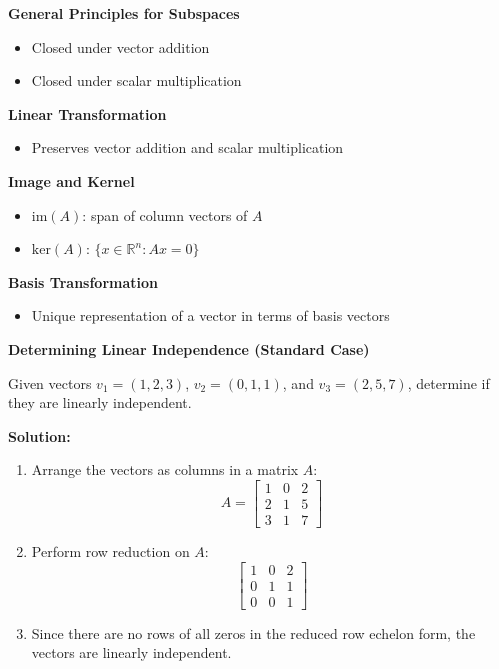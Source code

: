 \documentclass[8pt, a4paper, landscape]{extarticle}
\begin{document}
\begin{multicols*}{4}
  \textbf{General Principles for Subspaces}
  \begin{itemize}
    \item Closed under vector addition
    \item Closed under scalar multiplication
  \end{itemize}

  \textbf{Linear Transformation}
  \begin{itemize}
    \item Preserves vector addition and scalar multiplication
  \end{itemize}

  \textbf{Image and Kernel}
  \begin{itemize}
    \item $\text{im}(A)$: span of column vectors of $A$
    \item $\text{ker}(A)$: $\{x \in \mathbb{R}^n : Ax = 0\}$
  \end{itemize}

  \textbf{Basis Transformation}
  \begin{itemize}
    \item Unique representation of a vector in terms of basis vectors
  \end{itemize}

  \columnbreak

  \textbf{Determining Linear Independence (Standard Case)}

  Given vectors $v_1 = (1, 2, 3)$, $v_2 = (0, 1, 1)$, and $v_3 = (2, 5, 7)$, determine if they are linearly independent.

  \textbf{Solution:}
  \begin{enumerate}
    \item Arrange the vectors as columns in a matrix $A$:
          \[
            A = \begin{bmatrix}
              1 & 0 & 2 \\
              2 & 1 & 5 \\
              3 & 1 & 7
            \end{bmatrix}
          \]
    \item Perform row reduction on $A$:
          \[
            \begin{bmatrix}
              1 & 0 & 2 \\
              0 & 1 & 1 \\
              0 & 0 & 1
            \end{bmatrix}
          \]
    \item Since there are no rows of all zeros in the reduced row echelon form, the vectors are linearly independent.
  \end{enumerate}


\end{multicols*}
\end{document}
